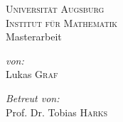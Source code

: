 \documentclass[a4paper,ngerman,11pt,bibliography=totoc]{scrartcl}
\theoremstyle{definition}
\theoremstyle{plain}
\theoremstyle{remark}
\begin{document}
\author{Lukas Graf}
\date{Letzte Aktualisierung: \today}

\thispagestyle{empty}


\begin{titlepage}\center
	\textsc{\LARGE Universität Augsburg}\\[1cm]
	
	\textsc{\Large Institut für Mathematik}\\[1.5cm]
	
	{\Large Masterarbeit \\[1cm]}
	{\huge {}}

	\vfill
	
	\begin{minipage}{0.4\textwidth}
		\begin{flushleft} \large
			\emph{von:}\\
			Lukas \textsc{Graf}
		\end{flushleft}
	\end{minipage}
	\begin{minipage}{0.4\textwidth}
		\begin{flushright} \large
			\emph{Betreut von:} \\
			Prof. Dr. Tobias \textsc{Harks}
		\end{flushright}
	\end{minipage}
	
\end{titlepage}


\listoftodos

\tableofcontents






\newpage
\nocite{*}
\printbibliography
\end{document}
